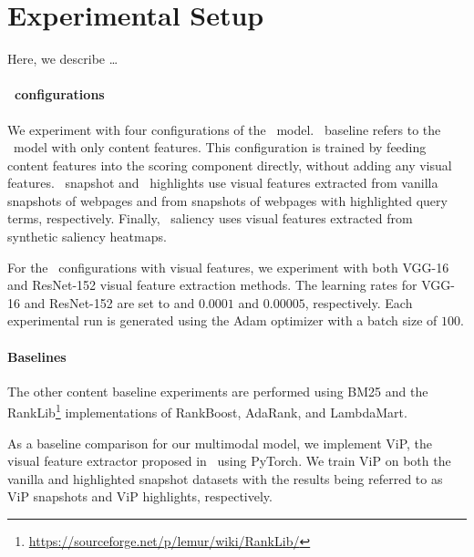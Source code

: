 
\section{Experimental Setup}\label{sec:setup}
Here, we describe \ldots


\paragraph{\modelname~configurations}
We experiment with four configurations of the \modelname~model.
\modelname~baseline refers to the \modelname~model with only content features.
This configuration is trained by feeding content features into the scoring component directly, without adding any visual features.
\modelname~snapshot and \modelname~highlights use visual features extracted from vanilla snapshots of webpages and from snapshots of webpages with highlighted query terms, respectively.
Finally, \modelname~saliency uses visual features extracted from synthetic saliency heatmaps.

For the \modelname~configurations with visual features, we experiment with both VGG-16 and ResNet-152 visual feature extraction methods.
The learning rates for VGG-16 and ResNet-152 are set to and $0.0001$ and $0.00005$, respectively. 
Each experimental run is generated using the Adam optimizer with a batch size of $100$.


\paragraph{Baselines}
The other content baseline experiments are performed using BM25 and the RankLib\footnote{\url{https://sourceforge.net/p/lemur/wiki/RankLib/}} implementations of RankBoost, AdaRank, and LambdaMart.

As a baseline comparison for our multimodal model, we implement ViP, the visual feature extractor proposed in~\citet{fan2017learning} using PyTorch. We train ViP on both the vanilla and highlighted snapshot datasets with the results being referred to as ViP snapshots and ViP highlights, respectively.


